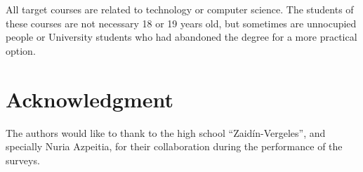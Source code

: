 \documentclass[journal,transmag]{IEEEtran}
\begin{document}
All target courses are related to technology or computer science. The students of these courses are not necessary 18 or 19 years old, but sometimes are unnocupied people or University students who had abandoned the degree for a more practical option.

\section*{Acknowledgment}

The authors would like to thank to the high school ``Zaid\'{i}n-Vergeles'', and specially Nuria Azpeitia, for their collaboration during the performance of the surveys.


\ifCLASSOPTIONcaptionsoff
  \newpage
\fi





%
%
%



% 
\end{document}
